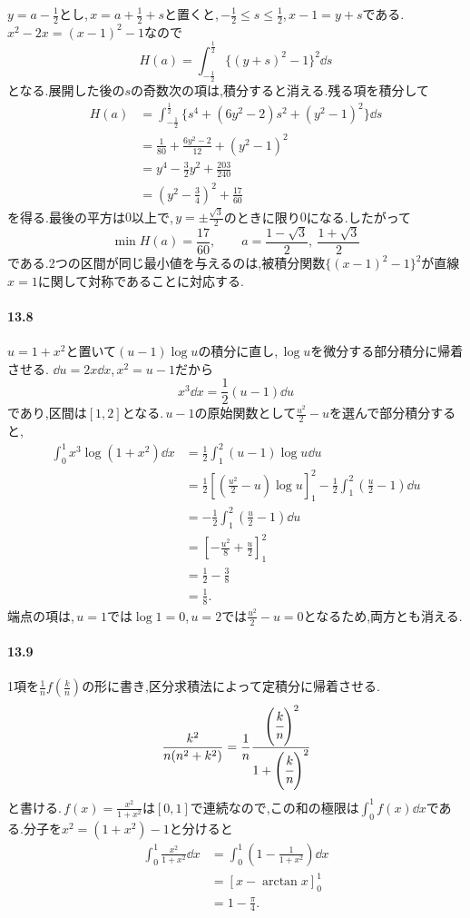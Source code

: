 $y=a-\frac12$とし,\,$x=a+\frac12+s$と置くと,\,$-\frac12\le s\le\frac12$,\,$x-1=y+s$である.\,$x^2-2x=(x-1)^2-1$なので
\[
 H(a)=\int_{-\frac12}^{\frac12}\{(y+s)^2-1\}^2\dd s
\]
となる.展開した後の$s$の奇数次の項は,積分すると消える.残る項を積分して
\[
 \begin{aligned}
 H(a)
 &=\int_{-\frac12}^{\frac12}
   \{s^4+(6y^2-2)s^2+(y^2-1)^2\}\dd s\\
 &=\frac1{80}+\frac{6y^2-2}{12}+(y^2-1)^2\\
 &=y^4-\frac32y^2+\frac{203}{240}\\
 &=\left(y^2-\frac34\right)^2+\frac{17}{60}
 \end{aligned}
\]
を得る.最後の平方は$0$以上で,\,$y=\pm\frac{\sqrt3}{2}$のときに限り$0$になる.したがって
\[
 \boxed{\min H(a)=\frac{17}{60},\qquad
 a=\frac{1-\sqrt3}{2},\ \frac{1+\sqrt3}{2}}
\]
である.2つの区間が同じ最小値を与えるのは,被積分関数$\{(x-1)^2-1\}^2$が直線$x=1$に関して対称であることに対応する.

\paragraph{13.8}
$u=1+x^2$と置いて$(u-1)\log u$の積分に直し,\,$\log u$を微分する部分積分に帰着させる.
$\dd u=2x\dd x$,\,$x^2=u-1$だから
\[
 x^3\dd x=\frac12(u-1)\dd u
\]
であり,区間は$[1,2]$となる.\,$u-1$の原始関数として$\frac{u^2}{2}-u$を選んで部分積分すると,
\[
 \begin{aligned}
 \int_0^1x^3\log(1+x^2)\dd x
 &=\frac12\int_1^2(u-1)\log u\dd u\\
 &=\frac12\left[\left(\frac{u^2}{2}-u\right)\log u\right]_1^2
   -\frac12\int_1^2\left(\frac u2-1\right)\dd u\\
 &=-\frac12\int_1^2\left(\frac u2-1\right)\dd u\\
 &=\left[-\frac{u^2}{8}+\frac u2\right]_1^2\\
 &=\frac12-\frac38\\
 &=\boxed{\frac18}.
 \end{aligned}
\]
端点の項は,\,$u=1$では$\log1=0$,\,$u=2$では$\frac{u^2}{2}-u=0$となるため,両方とも消える.

\paragraph{13.9}
1項を$\frac1nf\left(\frac kn\right)$の形に書き,区分求積法によって定積分に帰着させる.
\[
 \frac{k^2}{n(n^2+k^2)}
 =\frac1n\cfrac{\left(\cfrac kn\right)^2}{1+\left(\cfrac kn\right)^2}
\]
と書ける.\,$f(x)=\frac{x^2}{1+x^2}$は$[0,1]$で連続なので,この和の極限は$\int_0^1f(x)\dd x$である.分子を$x^2=(1+x^2)-1$と分けると
\[
 \begin{aligned}
 \int_0^1\frac{x^2}{1+x^2}\dd x
 &=\int_0^1\left(1-\frac1{1+x^2}\right)\dd x\\
 &=\left[x-\arctan x\right]_0^1\\
 &=\boxed{1-\frac{\pi}{4}}.
 \end{aligned}
\]

